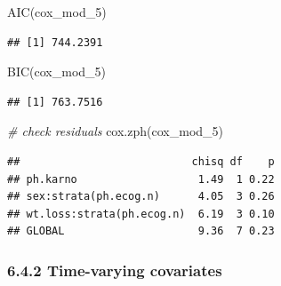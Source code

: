 \documentclass[
]{article}
\newenvironment{Shaded}{\begin{snugshade}}{\end{snugshade}}
\newcommand{\CommentTok}[1]{\textcolor[rgb]{0.56,0.35,0.01}{\textit{#1}}}
\newcommand{\FunctionTok}[1]{\textcolor[rgb]{0.00,0.00,0.00}{#1}}
\newcommand{\NormalTok}[1]{#1}
\begin{document}
\begin{Shaded}
\begin{Highlighting}[]
\FunctionTok{AIC}\NormalTok{(cox\_mod\_5)}
\end{Highlighting}
\end{Shaded}

\begin{verbatim}
## [1] 744.2391
\end{verbatim}

\begin{Shaded}
\begin{Highlighting}[]
\FunctionTok{BIC}\NormalTok{(cox\_mod\_5)}
\end{Highlighting}
\end{Shaded}

\begin{verbatim}
## [1] 763.7516
\end{verbatim}

\begin{Shaded}
\begin{Highlighting}[]
\CommentTok{\# check residuals}
\FunctionTok{cox.zph}\NormalTok{(cox\_mod\_5)}
\end{Highlighting}
\end{Shaded}

\begin{verbatim}
##                           chisq df    p
## ph.karno                   1.49  1 0.22
## sex:strata(ph.ecog.n)      4.05  3 0.26
## wt.loss:strata(ph.ecog.n)  6.19  3 0.10
## GLOBAL                     9.36  7 0.23
\end{verbatim}

\hypertarget{time-varying-covariates}{%
\subsubsection{6.4.2 Time-varying
covariates}\label{time-varying-covariates}}
\end{document}
